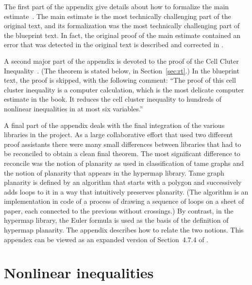 The first part of the appendix give details about how to formalize the
main estimate~\cite[Sec~7.4]{DSP}.  The main estimate is the most
technically challenging part of the original text, and its
formalization was the most technically challenging part of the
blueprint text.  In fact, the original proof of the main estimate
contained an error that was detected in the original text is described
and corrected in \cite{XX Revision}.

A second major part of the appendix is devoted to the proof of the
Cell Cluter Inequality~\cite[Thm~6.93]{DSP}.  (The theorem is stated
below, in Section~\ref{sec:rt}.)  In the blueprint text, the proof is
skipped, with the following comment: ``The proof of this cell cluster
inequality is a computer calculation, which is the most delicate
computer estimate in the book.  It reduces the cell cluster inequality
to hundreds of nonlinear inequalities in at most six variables.''

A final part of the appendix deals with the final integration of the
various libraries in the project.  As a large collaborative effort
that used two different proof assistants there were many small
differences between libraries that had to be reconciled to obtain a
clean final theorem.  The most significant difference to reconcile was
the notion of planarity as used in classification of tame graphs and
the notion of planarity that appears in the hypermap library.  Tame
graph planarity is defined by an algorithm that starts with a polygon
and successively adds loops to it in a way that intuitively preserves
planarity.  (The algorithm is an implementation in code of a process
of drawing a sequence of loops on a sheet of paper, each connected to
the previous without crossings.)  By contrast, in the hypermap
library, the Euler formula is used as the basis of the definition of
hypermap planarity.  The appendix describes how to relate the two
notions.  This appendex can be viewed as an expanded version of
Section~4.7.4 of \cite{DSP}.


\section{Nonlinear inequalities}

